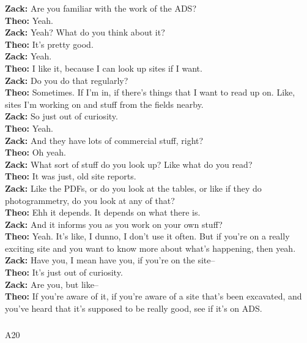 \documentclass[
]{article}
\makeatletter
\let\oldsubparagraph\subparagraph
\renewcommand{\subparagraph}{
    \@ifstar
      \xxxSubParagraphStar
      \xxxSubParagraphNoStar
  }
\newcommand{\xxxSubParagraphStar}[1]{\oldsubparagraph*{#1}\mbox{}}
\newcommand{\xxxSubParagraphNoStar}[1]{\oldsubparagraph{#1}\mbox{}}
\makeatother
\begin{document}
\textbf{Zack:} Are you familiar with the work of the ADS?\\
\textbf{Theo:} Yeah.\\
\textbf{Zack:} Yeah? What do you think about it?\\
\textbf{Theo:} It's pretty good.\\
\textbf{Zack:} Yeah.\\
\textbf{Theo:} I like it, because I can look up sites if I want.\\
\textbf{Zack:} Do you do that regularly?\\
\textbf{Theo:} Sometimes. If I'm in, if there's things that I want to
read up on. Like, sites I'm working on and stuff from the fields
nearby.\\
\textbf{Zack:} So just out of curiosity.\\
\textbf{Theo:} Yeah.\\
\textbf{Zack:} And they have lots of commercial stuff, right?\\
\textbf{Theo:} Oh yeah.\\
\textbf{Zack:} What sort of stuff do you look up? Like what do you
read?\\
\textbf{Theo:} It was just, old site reports.\\
\textbf{Zack:} Like the PDFs, or do you look at the tables, or like if
they do photogrammetry, do you look at any of that?\\
\textbf{Theo:} Ehh it depends. It depends on what there is.\\
\textbf{Zack:} And it informs you as you work on your own stuff?\\
\textbf{Theo:} Yeah. It's like, I dunno, I don't use it often. But if
you're on a really exciting site and you want to know more about what's
happening, then yeah.\\
\textbf{Zack:} Have you, I mean have you, if you're on the site--\\
\textbf{Theo:} It's just out of curiosity.\\
\textbf{Zack:} Are you, but like--\\
\textbf{Theo:} If you're aware of it, if you're aware of a site that's
been excavated, and you've heard that it's supposed to be really good,
see if it's on ADS.

\subparagraph{A20}\label{sec-A20}
\end{document}
